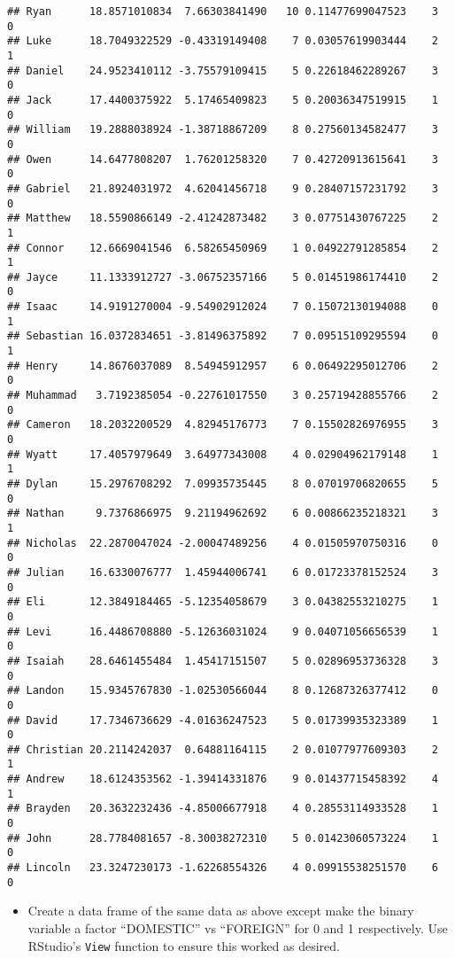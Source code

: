 \documentclass[
]{article}
\providecommand{\tightlist}{%
  \setlength{\itemsep}{0pt}\setlength{\parskip}{0pt}}
\begin{document}
\begin{verbatim}
## Ryan      18.8571010834  7.66303841490   10 0.11477699047523    3    0
## Luke      18.7049322529 -0.43319149408    7 0.03057619903444    2    1
## Daniel    24.9523410112 -3.75579109415    5 0.22618462289267    3    0
## Jack      17.4400375922  5.17465409823    5 0.20036347519915    1    0
## William   19.2888038924 -1.38718867209    8 0.27560134582477    3    0
## Owen      14.6477808207  1.76201258320    7 0.42720913615641    3    0
## Gabriel   21.8924031972  4.62041456718    9 0.28407157231792    3    0
## Matthew   18.5590866149 -2.41242873482    3 0.07751430767225    2    1
## Connor    12.6669041546  6.58265450969    1 0.04922791285854    2    1
## Jayce     11.1333912727 -3.06752357166    5 0.01451986174410    2    0
## Isaac     14.9191270004 -9.54902912024    7 0.15072130194088    0    1
## Sebastian 16.0372834651 -3.81496375892    7 0.09515109295594    0    1
## Henry     14.8676037089  8.54945912957    6 0.06492295012706    2    0
## Muhammad   3.7192385054 -0.22761017550    3 0.25719428855766    2    0
## Cameron   18.2032200529  4.82945176773    7 0.15502826976955    3    0
## Wyatt     17.4057979649  3.64977343008    4 0.02904962179148    1    1
## Dylan     15.2976708292  7.09935735445    8 0.07019706820655    5    0
## Nathan     9.7376866975  9.21194962692    6 0.00866235218321    3    1
## Nicholas  22.2870047024 -2.00047489256    4 0.01505970750316    0    0
## Julian    16.6330076777  1.45944006741    6 0.01723378152524    3    0
## Eli       12.3849184465 -5.12354058679    3 0.04382553210275    1    0
## Levi      16.4486708880 -5.12636031024    9 0.04071056656539    1    0
## Isaiah    28.6461455484  1.45417151507    5 0.02896953736328    3    0
## Landon    15.9345767830 -1.02530566044    8 0.12687326377412    0    0
## David     17.7346736629 -4.01636247523    5 0.01739935323389    1    0
## Christian 20.2114242037  0.64881164115    2 0.01077977609303    2    1
## Andrew    18.6124353562 -1.39414331876    9 0.01437715458392    4    1
## Brayden   20.3632232436 -4.85006677918    4 0.28553114933528    1    0
## John      28.7784081657 -8.30038272310    5 0.01423060573224    1    0
## Lincoln   23.3247230173 -1.62268554326    4 0.09915538251570    6    0
\end{verbatim}

\begin{itemize}
\tightlist
\item
  Create a data frame of the same data as above except make the binary
  variable a factor ``DOMESTIC'' vs ``FOREIGN'' for 0 and 1
  respectively. Use RStudio's \texttt{View} function to ensure this
  worked as desired.
\end{itemize}
\end{document}
